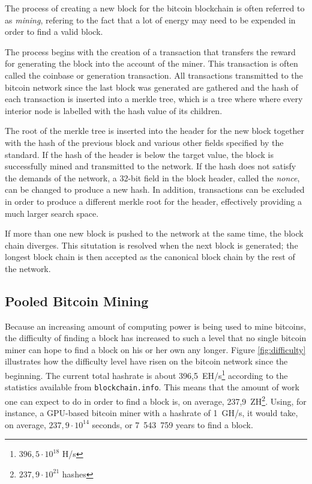 The process of creating a new block for the bitcoin blockchain is often referred to as \textit{mining},
refering to the fact that a lot of energy may need to be expended in order to find a valid block.

The process begins with the creation of a transaction that transfers the reward for generating the block
into the account of the miner. This transaction is often called the coinbase or generation transaction.
All transactions transmitted to the bitcoin network since the last block was generated are gathered and
the hash of each transaction is inserted into a merkle tree, which is a tree where where every interior
node is labelled with the hash value of its children.

The root of the merkle tree is inserted into the header for the new block together with the hash of the
previous block and various other fields specified by the standard. If the hash of the header is below the
target value, the block is successfully mined and transmitted to the network. If the hash does not satisfy
the demands of the network, a 32-bit field in the block header, called the \textit{nonce}, can be changed
to produce a new hash. In addition, transactions can be excluded in order to produce a different merkle
root for the header, effectively providing a much larger search space.

If more than one new block is pushed to the network at the same time, the block chain diverges.
This situtation is resolved when the next block is generated; the longest block chain is then accepted
as the canonical block chain by the rest of the network. \cite{bitcoin}

\subsection{Pooled Bitcoin Mining}

Because an increasing amount of computing power is being used to mine bitcoins, the difficulty of finding
a block has increased to such a level that no single bitcoin miner can hope to find a block on his or her
own any longer. Figure \ref{fig:difficulty} illustrates how the difficulty level have risen on the bitcoin network
since the beginning. The current total hashrate is about 396,5~EH/s\footnote{$396,5\cdot 10^{18}$ H/s} according to the
statistics available from \texttt{blockchain.info}. This means that the amount of work one can expect to
do in order to find a block is, on average, 237,9~ZH\footnote{$237,9\cdot 10^{21}$ hashes}. Using, for instance,
a GPU-based bitcoin miner with a hashrate of 1~GH/s, it would take, on average, $237,9\cdot 10^{14}$ seconds,
or 7~543~759 years to find a block.

